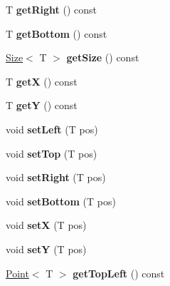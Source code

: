 \begin{DoxyCompactItemize}
\item 
\hypertarget{class_box_af1d21fffce6496b0fdbdda6daeb0b208}{
T {\bfseries getRight} () const }
\label{class_box_af1d21fffce6496b0fdbdda6daeb0b208}

\item 
\hypertarget{class_box_ad58e804875cef692c723e34439c721ee}{
T {\bfseries getBottom} () const }
\label{class_box_ad58e804875cef692c723e34439c721ee}

\item 
\hypertarget{class_box_a5a22bcdca003a53bea862c1550a0fbc1}{
\hyperlink{class_size}{Size}$<$ T $>$ {\bfseries getSize} () const }
\label{class_box_a5a22bcdca003a53bea862c1550a0fbc1}

\item 
\hypertarget{class_box_ad87b7a84b19926fe60db12ce46624cbb}{
T {\bfseries getX} () const }
\label{class_box_ad87b7a84b19926fe60db12ce46624cbb}

\item 
\hypertarget{class_box_ae2adebcecdde285e7edb0c913ab7ab84}{
T {\bfseries getY} () const }
\label{class_box_ae2adebcecdde285e7edb0c913ab7ab84}

\item 
\hypertarget{class_box_a300fcec469048ac543910beac79daaa2}{
void {\bfseries setLeft} (T pos)}
\label{class_box_a300fcec469048ac543910beac79daaa2}

\item 
\hypertarget{class_box_a9e5e2f4b7268a52906ebd441a79d5bdd}{
void {\bfseries setTop} (T pos)}
\label{class_box_a9e5e2f4b7268a52906ebd441a79d5bdd}

\item 
\hypertarget{class_box_a037ab25102c5bf2d050282ed35d6a312}{
void {\bfseries setRight} (T pos)}
\label{class_box_a037ab25102c5bf2d050282ed35d6a312}

\item 
\hypertarget{class_box_ac5d43338470ef5bfab770786b170f454}{
void {\bfseries setBottom} (T pos)}
\label{class_box_ac5d43338470ef5bfab770786b170f454}

\item 
\hypertarget{class_box_a4dcb975c536439998d7f6c0fc47b2358}{
void {\bfseries setX} (T pos)}
\label{class_box_a4dcb975c536439998d7f6c0fc47b2358}

\item 
\hypertarget{class_box_a976594b18e7c135903607265a14ba783}{
void {\bfseries setY} (T pos)}
\label{class_box_a976594b18e7c135903607265a14ba783}

\item 
\hypertarget{class_box_ac0f698d9054c81ce3f0b9e45b208aa83}{
\hyperlink{class_point}{Point}$<$ T $>$ {\bfseries getTopLeft} () const }
\label{class_box_ac0f698d9054c81ce3f0b9e45b208aa83}


\end{DoxyCompactItemize}
